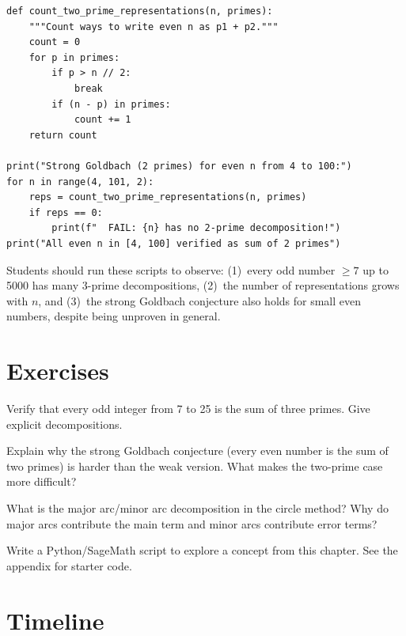 \begin{verbatim}
def count_two_prime_representations(n, primes):
    """Count ways to write even n as p1 + p2."""
    count = 0
    for p in primes:
        if p > n // 2:
            break
        if (n - p) in primes:
            count += 1
    return count

print("Strong Goldbach (2 primes) for even n from 4 to 100:")
for n in range(4, 101, 2):
    reps = count_two_prime_representations(n, primes)
    if reps == 0:
        print(f"  FAIL: {n} has no 2-prime decomposition!")
print("All even n in [4, 100] verified as sum of 2 primes")
\end{verbatim}

\begin{highlightbox}
Students should run these scripts to observe: (1)~every odd number $\geq 7$ up to 5000 has many 3-prime decompositions, (2)~the number of representations grows with $n$, and (3)~the strong Goldbach conjecture also holds for small even numbers, despite being unproven in general.
\end{highlightbox}

\section{Exercises}

\begin{exercise}[Basic]
Verify that every odd integer from 7 to 25 is the sum of three primes. Give explicit decompositions.
\end{exercise}

\begin{exercise}[Intermediate]
Explain why the strong Goldbach conjecture (every even number is the sum of two primes) is harder than the weak version. What makes the two-prime case more difficult?
\end{exercise}

\begin{exercise}[Challenge]
What is the major arc/minor arc decomposition in the circle method? Why do major arcs contribute the main term and minor arcs contribute error terms?
\end{exercise}


\begin{exercise}[Computational]
Write a Python/SageMath script to explore a concept from this chapter. See the appendix for starter code.
\end{exercise}

\section{Timeline}

